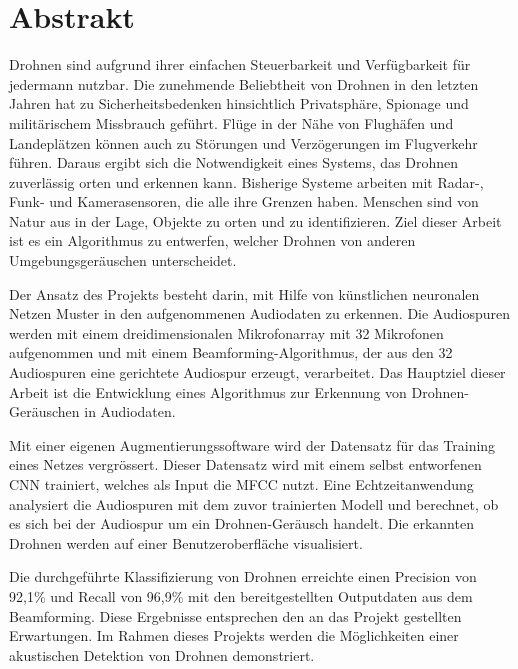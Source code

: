 %
%
%

\chapter*{Abstrakt}
	Drohnen sind aufgrund ihrer einfachen Steuerbarkeit und Verfügbarkeit für jedermann nutzbar.
	Die zunehmende Beliebtheit von Drohnen in den letzten Jahren hat zu Sicherheitsbedenken hinsichtlich Privatsphäre, Spionage und militärischem Missbrauch geführt.
	Flüge in der Nähe von Flughäfen und Landeplätzen können auch zu Störungen und Verzögerungen im Flugverkehr führen.
	Daraus ergibt sich die Notwendigkeit eines Systems, das Drohnen zuverlässig orten und erkennen kann.
	Bisherige Systeme arbeiten mit Radar-, Funk- und Kamerasensoren, die alle ihre Grenzen haben.
	Menschen sind von Natur aus in der Lage, Objekte zu orten und zu identifizieren.
	Ziel dieser Arbeit ist es ein Algorithmus zu entwerfen, welcher Drohnen von anderen Umgebungsgeräuschen unterscheidet.
	\vspace{10pt}
	
	Der Ansatz des Projekts besteht darin, mit Hilfe von künstlichen neuronalen Netzen Muster in den aufgenommenen Audiodaten zu erkennen.
	Die Audiospuren werden mit einem dreidimensionalen Mikrofonarray mit 32 Mikrofonen aufgenommen und mit einem Beamforming-Algorithmus, der aus den 32 Audiospuren eine gerichtete Audiospur erzeugt, verarbeitet.
	Das Hauptziel dieser Arbeit ist die Entwicklung eines Algorithmus zur Erkennung von Drohnen-Geräuschen in Audiodaten.
	
	Mit einer eigenen Augmentierungssoftware wird der Datensatz für das Training eines Netzes vergrössert.
	Dieser Datensatz wird mit einem selbst entworfenen CNN trainiert, welches als Input die MFCC nutzt.
	Eine Echtzeitanwendung analysiert die Audiospuren mit dem zuvor trainierten Modell und berechnet, ob es sich bei der Audiospur um ein Drohnen-Geräusch handelt.
	Die erkannten Drohnen werden auf einer Benutzeroberfläche visualisiert.
	\vspace{10pt}
	
	Die durchgeführte Klassifizierung von Drohnen erreichte einen Precision von 92,1\% und Recall von 96,9\% mit den bereitgestellten Outputdaten aus dem Beamforming.
	Diese Ergebnisse entsprechen den an das Projekt gestellten Erwartungen.
	Im Rahmen dieses Projekts werden die Möglichkeiten einer akustischen Detektion von Drohnen demonstriert.
	
	